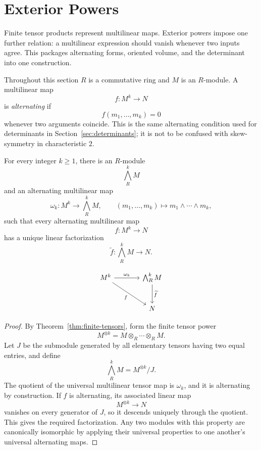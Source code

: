 \section{Exterior Powers}\label{sec:exterior-algebra}
Finite tensor products represent multilinear maps.  Exterior powers impose
one further relation: a multilinear expression should vanish whenever two
inputs agree.  This packages alternating forms, oriented volume, and the
determinant into one construction.

Throughout this section \(R\) is a commutative ring and \(M\) is an
\(R\)-module.  A multilinear map
\[
f:M^k\longrightarrow N
\]
is \emph{alternating} if
\[
f(m_1,\ldots,m_k)=0
\]
whenever two arguments coincide.  This is the same alternating condition
used for determinants in Section~\ref{sec:determinants}; it is
not to be confused with skew-symmetry in characteristic \(2\).

\begin{theorem}\label{thm:exterior-power}
For every integer \(k\geq1\), there is an \(R\)-module
\[
\bigwedge_R^kM
\]
and an alternating multilinear map
\[
\omega_k:M^k\longrightarrow\bigwedge_R^kM,
\qquad
(m_1,\ldots,m_k)\longmapsto m_1\wedge\cdots\wedge m_k,
\]
such that every alternating multilinear map
\[
f:M^k\longrightarrow N
\]
has a unique linear factorization
\[
\widetilde f:\bigwedge_R^kM\longrightarrow N.
\]
\end{theorem}
\[
\begin{tikzcd}[column sep=large, row sep=large]
M^k \arrow[r, "\omega_k"] \arrow[dr, "f"'] &
\bigwedge_R^k M \arrow[d, "\widetilde f"] \\
& N
\end{tikzcd}
\]
\begin{proof}
By Theorem~\ref{thm:finite-tensors}, form the finite tensor power
\[
M^{\otimes k}
=M\otimes_R\cdots\otimes_RM.
\]
Let \(J\) be the submodule generated by all elementary tensors having two equal
entries, and define
\[
\bigwedge_R^kM=M^{\otimes k}/J.
\]
The quotient of the universal multilinear tensor map is \(\omega_k\), and
it is alternating by construction.  If \(f\) is alternating, its associated
linear map
\[
M^{\otimes k}\longrightarrow N
\]
vanishes on every generator of \(J\), so it descends uniquely through the
quotient.  This gives the required factorization.  Any two modules with this
property are canonically isomorphic by applying their universal properties
to one another's universal alternating maps.
\end{proof}

